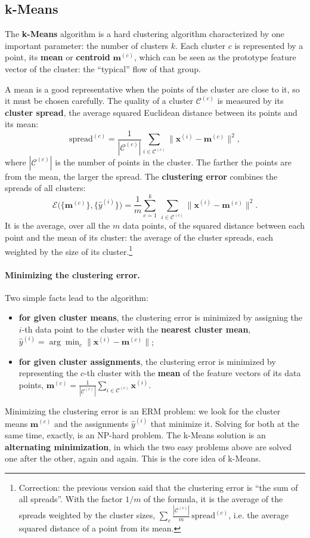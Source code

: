\subsection{k-Means}
The \textbf{k-Means} algorithm is a hard clustering algorithm characterized by one important parameter: the number of clusters $k$. Each cluster $c$ is represented by a point, its \textbf{mean} or \textbf{centroid} $\mathbf{m}^{(c)}$, which can be seen as the prototype feature vector of the cluster: the ``typical'' flow of that group.

A mean is a good representative when the points of the cluster are close to it, so it must be chosen carefully. The quality of a cluster $\mathcal{C}^{(c)}$ is measured by its \textbf{cluster spread}, the average squared Euclidean distance between its points and its mean:
\[
\text{spread}^{(c)} = \frac{1}{|\mathcal{C}^{(c)}|}\sum_{i \in \mathcal{C}^{(c)}} \big\|\mathbf{x}^{(i)} - \mathbf{m}^{(c)}\big\|^2 ,
\]
where $|\mathcal{C}^{(c)}|$ is the number of points in the cluster. The farther the points are from the mean, the larger the spread. The \textbf{clustering error} combines the spreads of all clusters:
\[
\mathcal{E}\big(\{\mathbf{m}^{(c)}\}, \{\widehat{y}^{(i)}\}\big) = \frac{1}{m}\sum_{c=1}^{k}\ \sum_{i \in \mathcal{C}^{(c)}} \big\|\mathbf{x}^{(i)} - \mathbf{m}^{(c)}\big\|^2 .
\]
It is the average, over all the $m$ data points, of the squared distance between each point and the mean of its cluster: the average of the cluster spreads, each weighted by the size of its cluster.\footnote{Correction: the previous version said that the clustering error is ``the sum of all spreads''. With the factor $1/m$ of the formula, it is the average of the spreads weighted by the cluster sizes, $\sum_c \frac{|\mathcal{C}^{(c)}|}{m}\,\text{spread}^{(c)}$, i.e. the average squared distance of a point from its mean.}

\paragraph{Minimizing the clustering error.} Two simple facts lead to the algorithm:
\begin{itemize}
    \item \textbf{for given cluster means}, the clustering error is minimized by assigning the $i$-th data point to the cluster with the \textbf{nearest cluster mean}, $\widehat{y}^{(i)} = \arg\min_{c}\|\mathbf{x}^{(i)} - \mathbf{m}^{(c)}\|$;
    \item \textbf{for given cluster assignments}, the clustering error is minimized by representing the $c$-th cluster with the \textbf{mean} of the feature vectors of its data points, $\mathbf{m}^{(c)} = \frac{1}{|\mathcal{C}^{(c)}|}\sum_{i \in \mathcal{C}^{(c)}} \mathbf{x}^{(i)}$.
\end{itemize}
Minimizing the clustering error is an ERM problem: we look for the cluster means $\mathbf{m}^{(c)}$ and the assignments $\widehat{y}^{(i)}$ that minimize it. Solving for both at the same time, exactly, is an NP-hard problem. The k-Means solution is an \textbf{alternating minimization}, in which the two easy problems above are solved one after the other, again and again. This is the core idea of k-Means.

